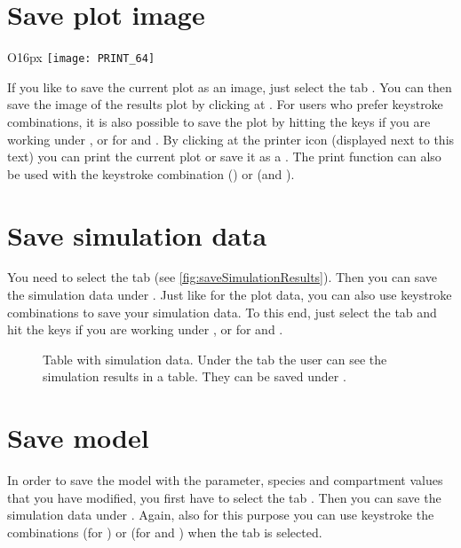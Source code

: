 \section{Save plot image}
\begin{wrapfigure}{O}{16px}
\vspace{\wrapfigspace}
\texttt{[image: PRINT\_64]}
\end{wrapfigure}
If you like to save the current plot as an image, just select the tab . You can then save the image of the results plot by clicking at .
For users who prefer keystroke combinations, it is also possible to save the plot by hitting the keys  if you are working under \MacOSX, or  for \Linux and \Windows.
By clicking at the printer icon (displayed next to this text) you can print the current plot or save it as a \PDF.
The print function can also be used with the keystroke combination  (\MacOSX) or  (\Windows and \Linux).

\section{Save simulation data}
\label{ch:savesim}
You need to select the tab  (see \vref{fig:saveSimulationResults}).
Then you can save the simulation data under .
Just like for the plot data, you can also use keystroke combinations to save your simulation data. To this end, just select the tab  and hit the keys  if you are working under \MacOSX, or  for \Linux and \Windows.
\begin{figure}[h]
\centering
{}
\caption[Table with simulation data]{Table with simulation data.
Under the tab  the user can see the simulation results in a table.
They can be saved under .}
\label{fig:saveSimulationResults}
\end{figure}

\section{Save model}
In order to save the model with the parameter, species and compartment values that you have modified, you first have to select the tab .
Then you can save the simulation data under .
Again, also for this purpose you can use keystroke the combinations  (for \MacOSX) or  (for \Linux and \Windows) when the  tab is selected.

